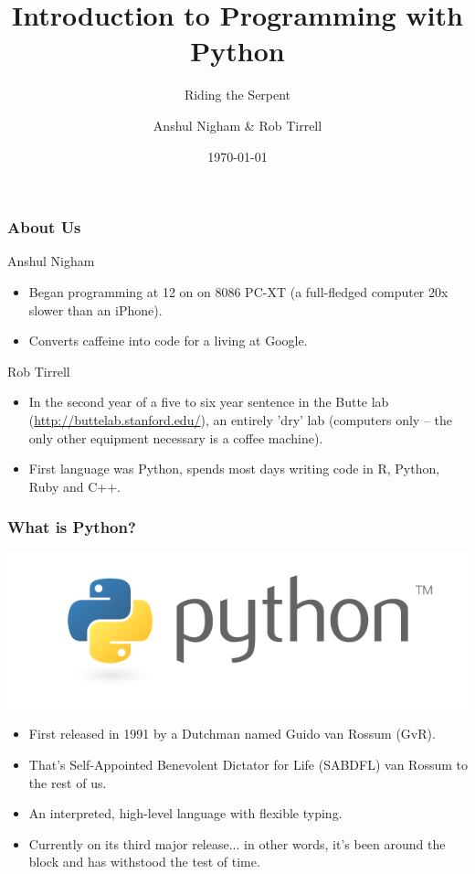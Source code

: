 \documentclass[10pt]{beamer}
\title{Introduction to Programming with Python}
\subtitle{Riding the Serpent}
\author{Anshul Nigham \& Rob Tirrell}
\date{\today}
\begin{document}
\begin{frame}
  \titlepage
\end{frame}

\begin{frame}
  \small
  \frametitle{About Us}
  \begin{block}{Anshul Nigham}
    \begin{itemize}
      \item Began programming at 12 on on 8086 PC-XT (a full-fledged computer 20x slower than an iPhone).
      \item Converts caffeine into code for a living at Google.
    \end{itemize}
  \end{block}
  \begin{block}{Rob Tirrell}
    \begin{itemize}
      \item In the second year of a five to six year sentence in the Butte lab (\href{http://buttelab.stanford.edu/}{http://buttelab.stanford.edu/}), an entirely 'dry' lab (computers only -- the only other equipment necessary is a coffee machine).
      \item First language was Python, spends most days writing code in R, Python, Ruby and C++.
    \end{itemize}
  \end{block}
\end{frame}

\begin{frame}
  \frametitle{What is Python?}
  \centering
  \includegraphics[scale=0.5]{PythonLogo.png} \\
  \begin{itemize}
    \item First released in 1991 by a Dutchman named Guido van Rossum (GvR).
    \item That's Self-Appointed Benevolent Dictator for Life (SABDFL) van Rossum to the rest of us.
    \item An interpreted, high-level language with flexible typing.
    \item Currently on its third major release... in other words, it's been around the block and has withstood the test of time.
  \end{itemize}
\end{frame}
\end{document}
